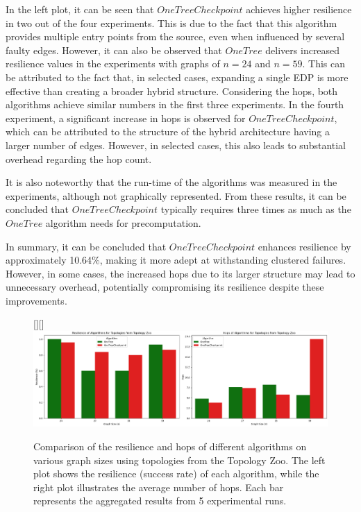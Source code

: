 \documentclass[a4paper,UKenglish,cleveref, autoref, thm-restate,dvipsnames]{lipics-v2021}
\begin{document}
In the left plot, it can be seen that $OneTreeCheckpoint$ achieves higher resilience in two out of the four experiments. This is due to the fact that this algorithm provides multiple entry points from the source, even when influenced by several faulty edges.
However, it can also be observed that $OneTree$ delivers increased resilience values in the experiments with graphs of $n=24$ and $n=59$. This can be attributed to the fact that, in selected cases, expanding a single EDP is more effective than creating a broader hybrid structure.
Considering the hops, both algorithms achieve similar numbers in the first three experiments. 
In the fourth experiment, a significant increase in hops is observed for $OneTreeCheckpoint$, which can be attributed to the structure of the hybrid architecture having a larger number of edges. However, in selected cases, this also leads to substantial overhead regarding the hop count.

It is also noteworthy that the run-time of the algorithms was measured in the experiments, although not graphically represented. From these results, it can be concluded that $OneTreeCheckpoint$ typically requires three times as much as the $OneTree$ algorithm needs for precomputation.

In summary, it can be concluded that $OneTreeCheckpoint$ enhances resilience by approximately 10.64\%, making it more adept at withstanding clustered failures. However, in some cases, the increased hops due to its larger structure may lead to unnecessary overhead, potentially compromising its resilience despite these improvements.

\begin{figure}[h]
    \centering
    \raisebox{0pt}[\height][\depth]{\hspace*{-2.8cm}\includegraphics[scale=0.3]{figures/realTopoAfterChange.png}}
    \caption{Comparison of the resilience and hops of different algorithms on various graph sizes using topologies from the Topology Zoo. The left plot shows the resilience (success rate) of each algorithm, while the right plot illustrates the average number of hops. Each bar represents the aggregated results from 5 experimental runs.}
    \label{realtopofig}
\end{figure}
\end{document}
